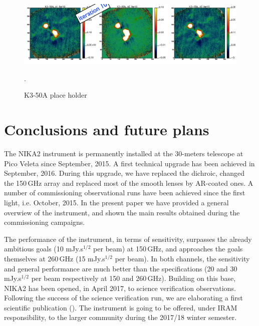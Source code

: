 \documentclass[]{aa} %
\begin{document}
\begin{figure}[h]
   \centering
   \includegraphics[width=.95\linewidth]{K3-50A.png}
   \caption{K3-50A place holder}. 
   \label{fig:k3-50a}
\end{figure}






\section{Conclusions and future plans}

The NIKA2 instrument is permanently installed at the 30-meters telescope at Pico Veleta since September, 2015. A first technical upgrade has been achieved in September, 2016. During this upgrade, we have replaced the dichroic, changed the 150\,GHz array and replaced most of the smooth lenses by AR-coated ones. A number of commissioning observational runs have been achieved since the first light, i.e. October, 2015. In the present paper we have provided a general overwiew of the instrument, and shown the main results obtained during the commissioning campaigns. 

The performance of the instrument, in terms of sensitivity, surpasses the already ambitious goals (10 mJy.s$^{1/2}$ per beam) at 150\,GHz, and approaches the goals themselves at 260\,GHz (15 mJy.s$^{1/2}$ per beam). In both channels, the sensitivity and general performance are much better than the specifications (20 and 30 mJy.s$^{1/2}$ per beam respectively at 150 and 260\,GHz). Building on this base, NIKA2 has been opened, in April 2017, to science verification observations. Following the success of the science verification run, we are elaborating a first scientific publication (\cite{Ruppin2017}). The instrument is going to be offered, under IRAM responsibility, to the larger community during the 2017/18 winter semester. 
\end{document}

